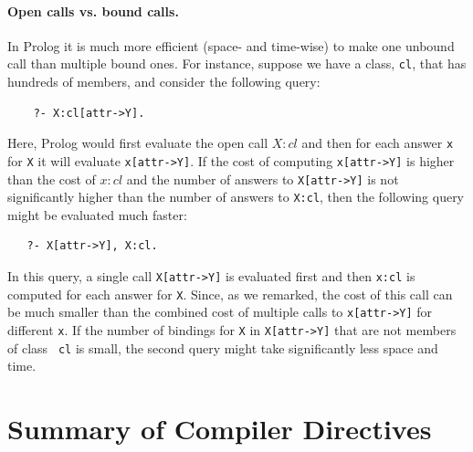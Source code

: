 \documentclass[11pt]{article}
\begin{document}
\paragraph{Open calls vs. bound calls.}
In Prolog it is much more efficient (space- and
time-wise) to make one unbound call than multiple bound ones. For instance,
suppose we have a class, {\tt cl}, that has hundreds of members, and
consider the following query:
\begin{verbatim}
    ?- X:cl[attr->Y].  
\end{verbatim}
Here, Prolog would first evaluate the open call $X:cl$ and then for each
answer {\tt x} for {\tt X} it will evaluate {\tt x[attr->Y]}.
If the cost of computing {\tt x[attr->Y]} is higher than the cost of $x:cl$
and the number of answers to {\tt X[attr->Y]} is not significantly
higher than the number of answers to {\tt X:cl}, then the following query
might be evaluated much faster:
\begin{verbatim}
   ?- X[attr->Y], X:cl.  
\end{verbatim}
In this query, a single call {\tt X[attr->Y]} is evaluated first and then
{\tt x:cl} is computed for each answer for {\tt X}.  Since, as we remarked,
the cost of this call can be much smaller than the combined cost of
multiple calls to {\tt x[attr->Y]} for different {\tt x}.  If the number of
bindings for {\tt X} in {\tt X[attr->Y]} that are not members of class {\tt
  cl} is small, the second query might take significantly less space and
time.


\section{Summary of Compiler Directives} \label{sec-comp-directives}
\end{document}
